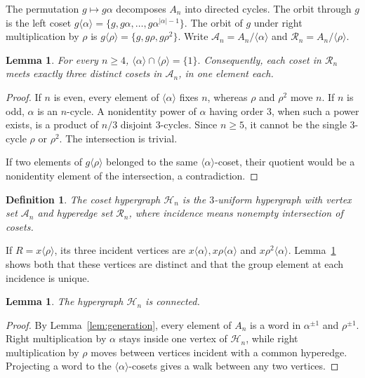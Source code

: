 \documentclass[4pt]{article} %
\newtheorem{lemma}[theorem]{Lemma}
\newtheorem{definition}[theorem]{Definition}
\newcommand{\la}{\langle}
\newcommand{\ra}{\rangle}
\begin{document}
The permutation $g\mapsto g\alpha$ decomposes $A_n$ into directed cycles.
The orbit through $g$ is the left coset
$
 g\la\alpha\ra
   =\{g,g\alpha,\ldots,g\alpha^{|\alpha|-1}\}.
$
The orbit of $g$ under right multiplication by $\rho$ is
$g\la\rho\ra=\{g,g\rho,g\rho^2\}$. Write
$
 \mathcal A_n=A_n/\la\alpha\ra$ and $
 \mathcal R_n=A_n/\la\rho\ra.
$

\begin{lemma}\label{lem:trivial-intersection}
For every $n\geq4$,
$
 \la\alpha\ra\cap\la\rho\ra=\{1\}.
$
Consequently, each coset in $\mathcal R_n$ meets exactly three distinct
cosets in $\mathcal A_n$, in one element each.
\end{lemma}

\begin{proof}
If $n$ is even, every element of $\la\alpha\ra$ fixes $n$, whereas $\rho$ and
$\rho^2$ move $n$. If $n$ is odd, $\alpha$ is an $n$-cycle. A nonidentity
power of $\alpha$ having order $3$, when such a power exists, is a product of
$n/3$ disjoint $3$-cycles. Since $n\geq5$, it cannot be the single
$3$-cycle $\rho$ or $\rho^2$. The intersection is trivial.

If two elements of $g\la\rho\ra$ belonged to the same
$\la\alpha\ra$-coset, their quotient would be a nonidentity element of the
intersection, a contradiction.
\end{proof}

\begin{definition}\label{def:Hn}
The coset hypergraph $\mathcal H_n$ is the $3$-uniform hypergraph with vertex
set $\mathcal A_n$ and hyperedge set $\mathcal R_n$, where incidence means
nonempty intersection of cosets.
\end{definition}

If $R=x\la\rho\ra$, its three incident vertices are
$
 x\la\alpha\ra,
 x\rho\la\alpha\ra$ and $
 x\rho^2\la\alpha\ra.
$
Lemma~\ref{lem:trivial-intersection} shows both that these vertices are
distinct and that the group element at each incidence is unique.

\begin{lemma}\label{lem:H-connected}
The hypergraph $\mathcal H_n$ is connected.
\end{lemma}

\begin{proof}
By Lemma~\ref{lem:generation}, every element of $A_n$ is a word in
$\alpha^{\pm1}$ and $\rho^{\pm1}$. Right multiplication by $\alpha$ stays
inside one vertex of $\mathcal H_n$, while right multiplication by $\rho$
moves between vertices incident with a common hyperedge. Projecting a word
to the $\la\alpha\ra$-cosets gives a walk between any two vertices.
\end{proof}
\end{document}
